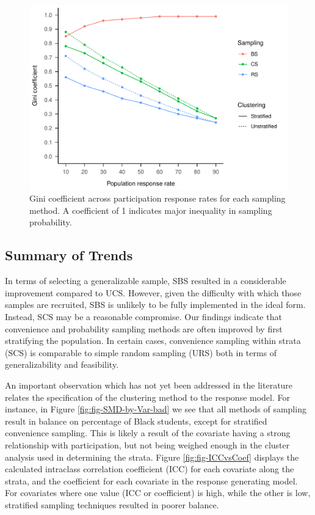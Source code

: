 \documentclass[man,floatsintext]{apa6}
\begin{document}
\begin{figure}
\centering
\includegraphics{GenSamp-Paper_files/figure-latex/fig-gini-1.pdf}
\caption{\label{fig:fig-gini}Gini coefficient across participation response rates for each sampling method. A coefficient of 1 indicates major inequality in sampling probability.}
\end{figure}

\hypertarget{summary-of-trends}{%
\subsection{Summary of Trends}\label{summary-of-trends}}

In terms of selecting a generalizable sample, SBS resulted in a considerable improvement compared to UCS. However, given the difficulty with which those samples are recruited, SBS is unlikely to be fully implemented in the ideal form. Instead, SCS may be a reasonable compromise. Our findings indicate that convenience and probability sampling methods are often improved by first stratifying the population. In certain cases, convenience sampling within strata (SCS) is comparable to simple random sampling (URS) both in terms of generalizability and feasibility.

An important observation which has not yet been addressed in the literature relates the specification of the clustering method to the response model. For instance, in Figure \ref{fig:fig-SMD-by-Var-bad} we see that all methods of sampling result in balance on percentage of Black students, except for stratified convenience sampling. This is likely a result of the covariate having a strong relationship with participation, but not being weighed enough in the cluster analysis used in determining the strata. Figure \ref{fig:fig-ICCvsCoef} displays the calculated intraclass correlation coefficient (ICC) for each covariate along the strata, and the coefficient for each covariate in the response generating model. For covariates where one value (ICC or coefficient) is high, while the other is low, stratified sampling techniques resulted in poorer balance.
\end{document}
